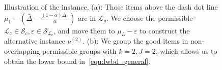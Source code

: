 \documentclass[twoside,11pt]{article}
\newcommand{\calL}{\mathcal{L}}
\newcommand{\calS}{\mathcal{S}}
\newcommand{\rmc}{\mathrm{c}}
\newcommand{\FE}{\textrm{FE}}
\newcommand{\barDelta}{\bar{\Delta}}
\begin{document}
\begin{figure}[t]
{{
    }
}

\caption{Illustration of the instance. (a): Those items above the dash dot line $\mu_1-(\barDelta-\frac{(1-\alpha)\Delta_L}{\alpha})$ are in $\calL_g$. We choose the permissible $\calL_{\rmc}\in\calS_c,\varepsilon\in\calS_{\calL_{\rmc}}$, and move them to $\mu_L-\varepsilon$ to construct the alternative instance $\nu^{(2)}$. (b): We group the good items in non-overlapping permissible groups with $k=2, J=2$, which allows us to obtain the lower bound in~\eqref{equ:lwbd_general}.}
\label{fig:lwbd_general}
\end{figure}
\end{document}
